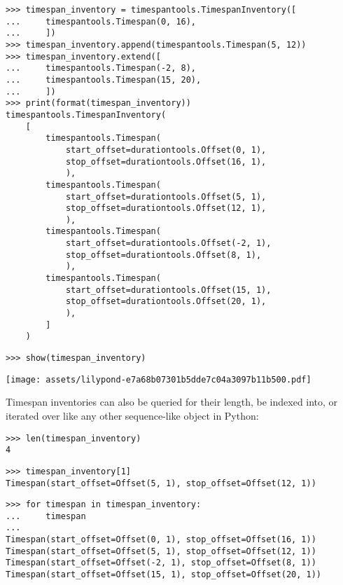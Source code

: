 \begin{abjadbookoutput}
\begin{singlespacing}
\vspace{-0.5\baselineskip}
\begin{verbatim}
>>> timespan_inventory = timespantools.TimespanInventory([
...     timespantools.Timespan(0, 16),
...     ])
>>> timespan_inventory.append(timespantools.Timespan(5, 12))
>>> timespan_inventory.extend([
...     timespantools.Timespan(-2, 8),
...     timespantools.Timespan(15, 20),
...     ])
>>> print(format(timespan_inventory))
timespantools.TimespanInventory(
    [
        timespantools.Timespan(
            start_offset=durationtools.Offset(0, 1),
            stop_offset=durationtools.Offset(16, 1),
            ),
        timespantools.Timespan(
            start_offset=durationtools.Offset(5, 1),
            stop_offset=durationtools.Offset(12, 1),
            ),
        timespantools.Timespan(
            start_offset=durationtools.Offset(-2, 1),
            stop_offset=durationtools.Offset(8, 1),
            ),
        timespantools.Timespan(
            start_offset=durationtools.Offset(15, 1),
            stop_offset=durationtools.Offset(20, 1),
            ),
        ]
    )
\end{verbatim}
\begin{verbatim}
>>> show(timespan_inventory)
\end{verbatim}
\noindent\texttt{[image: assets/lilypond-e7a68b07301b5dde7c04a3097b11b500.pdf]}
\end{singlespacing}
\end{abjadbookoutput}

\noindent Timespan inventories can also be queried for their length, be indexed
into, or iterated over like any other sequence-like object in Python:

\begin{comment}
<abjad>
len(timespan_inventory)
timespan_inventory[1]
for timespan in timespan_inventory:
    timespan

</abjad>
\end{comment}

\begin{abjadbookoutput}
\begin{singlespacing}
\vspace{-0.5\baselineskip}
\begin{verbatim}
>>> len(timespan_inventory)
4
\end{verbatim}
\begin{verbatim}
>>> timespan_inventory[1]
Timespan(start_offset=Offset(5, 1), stop_offset=Offset(12, 1))
\end{verbatim}
\begin{verbatim}
>>> for timespan in timespan_inventory:
...     timespan
...
Timespan(start_offset=Offset(0, 1), stop_offset=Offset(16, 1))
Timespan(start_offset=Offset(5, 1), stop_offset=Offset(12, 1))
Timespan(start_offset=Offset(-2, 1), stop_offset=Offset(8, 1))
Timespan(start_offset=Offset(15, 1), stop_offset=Offset(20, 1))
\end{verbatim}
\end{singlespacing}
\end{abjadbookoutput}

